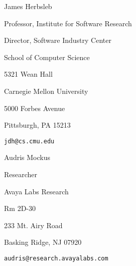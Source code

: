 \documentclass[margin,line,article]{res}
\newenvironment{list1}{
  \begin{list}{}{%
      \setlength{\itemsep}{0in}
      \setlength{\parsep}{0in} \setlength{\parskip}{0in}
      \setlength{\topsep}{0in} \setlength{\partopsep}{0in} 
      \setlength{\leftmargin}{0.17in}}}{\end{list}}
\begin{document}
\begin{resume}
James Herbsleb
\begin{list1}
\item Professor, Institute for Software Research
\item Director, Software Industry Center
\item School of Computer Science
\item 5321 Wean Hall
\item Carnegie Mellon University
\item 5000 Forbes Avenue
\item Pittsburgh, PA 15213
\item \texttt{jdh@cs.cmu.edu}
\end{list1}

Audris Mockus
\begin{list1}
\item Researcher
\item Avaya Labs Research
\item Rm 2D-30
\item 233 Mt. Airy Road
\item Basking Ridge, NJ 07920
\item \texttt{audris@research.avayalabs.com}
\end{list1}

\end{resume}
\end{document}
